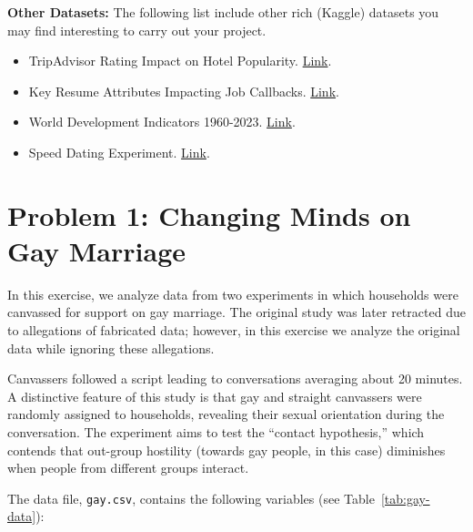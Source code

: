 \documentclass[12pt]{article}
\begin{document}
\noindent\textbf{Other Datasets:} The following list include other rich (Kaggle) datasets you may find interesting to carry out your project.
\begin{itemize}
    \item TripAdvisor Rating Impact on Hotel Popularity.  \href{https://www.kaggle.com/datasets/jocelyndumlao/tripadvisor-rating-impact-on-hotel-popularity}{Link}.
    \item Key Resume Attributes Impacting Job Callbacks. \href{https://www.kaggle.com/datasets/jocelyndumlao/tripadvisor-rating-impact-on-hotel-popularity}{Link}.
    \item World Development Indicators 1960-2023. \href{https://www.kaggle.com/datasets/david780514/world-bank-world-development-indicators-1960-2023}{Link}.
    \item Speed Dating Experiment. \href{https://www.kaggle.com/datasets/annavictoria/speed-dating-experiment}{Link}.
\end{itemize}

\newpage

\section*{\large Problem 1: Changing Minds on Gay Marriage}

In this exercise, we analyze data from two experiments in which households were canvassed for support on gay marriage. The original study was later retracted due to allegations of fabricated data; however, in this exercise we analyze the original data while ignoring these allegations.

Canvassers followed a script leading to conversations averaging about 20 minutes. A distinctive feature of this study is that gay and straight canvassers were randomly assigned to households, revealing their sexual orientation during the conversation. The experiment aims to test the ``contact hypothesis,'' which contends that out-group hostility (towards gay people, in this case) diminishes when people from different groups interact.

The data file, \texttt{gay.csv}, contains the following variables (see Table~\ref{tab:gay-data}):
\end{document}
